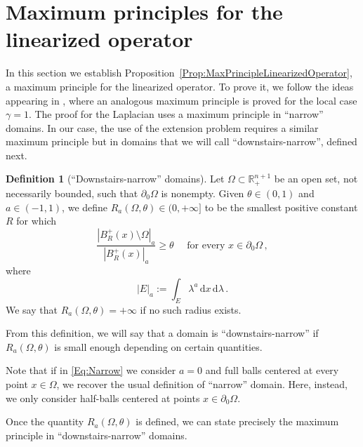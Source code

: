 \documentclass[12pt,reqno]{amsart}
\theoremstyle{definition}
\newtheorem{definition}[theorem]{Definition}
\theoremstyle{remark}
\newcommand{\con}[1]{\mathbb{#1}}
\newcommand{\R}{\con{R}} %
\newcommand{\s}{\gamma}
\renewcommand{\d}{\,\mathrm{d}} %
\newcommand{\dx}{\,\mathrm{d}x} %
\numberwithin{equation}{section}
\begin{document}
\section{Maximum principles for the linearized operator}
\label{Sec:MaximumPrinciple}

In this section we establish Proposition~\ref{Prop:MaxPrincipleLinearizedOperator}, a maximum principle for the linearized operator. To prove it, we follow the ideas appearing in \cite{Cabre-Saddle}, where an analogous maximum principle is proved for the local case $\s = 1$. The proof for the Laplacian uses a maximum principle in ``narrow'' domains. In our case, the use of the extension problem requires a similar maximum principle but in domains that we will call ``downstairs-narrow''\!, defined next.

\begin{definition}[``Downstairs-narrow'' domains]
Let $\Omega \subset \R^{n+1}_+$ be an open set, not necessarily bounded, such that $\partial_0 \Omega$ is nonempty. Given $\theta \in (0,1)$ and $a\in (-1,1)$, we define $R_a(\Omega,\theta) \in (0, +\infty]$ to be the smallest positive constant $R$ for which
\begin{equation}
\label{Eq:Narrow}
\dfrac{|B^+_R(x)\setminus \Omega|_a}{|B^+_R(x)|_a} \geq \theta \quad \text{ for every } x \in \partial_0 \Omega\,,
\end{equation}
where 
$$
|E|_a := \int_E \lambda^a \dx \d \lambda\,.
$$
We say that $R_a(\Omega,\theta) = + \infty$ if no such radius exists.

From this definition, we will say that a domain is ``downstairs-narrow'' if $R_a(\Omega,\theta)$ is small enough depending on certain quantities.
\end{definition}

Note that if in \eqref{Eq:Narrow} we consider $a=0$ and full balls centered at every point $x\in \Omega$, we recover the usual definition of ``narrow'' domain. Here, instead, we only consider half-balls centered at points $x\in \partial_0\Omega$.

Once the quantity  $R_a(\Omega,\theta)$ is defined, we can state precisely the maximum principle in ``downstairs-narrow'' domains.
\end{document}
